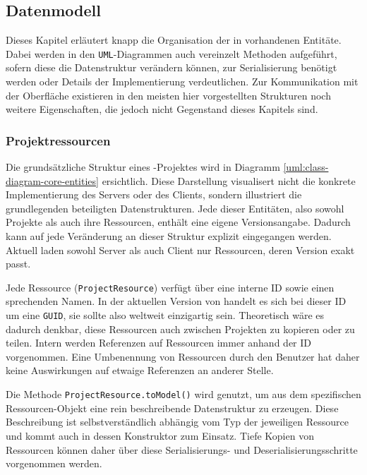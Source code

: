 \subsection{Datenmodell}

Dieses Kapitel erläutert knapp die Organisation der in \idename{} vorhandenen Entitäte. Dabei werden in den \texttt{UML}-Diagrammen auch vereinzelt Methoden aufgeführt, sofern diese die Datenstruktur verändern können, zur Serialisierung benötigt werden oder Details der Implementierung verdeutlichen. Zur Kommunikation mit der Oberfläche existieren in den meisten hier vorgestellten Strukturen noch weitere Eigenschaften, die jedoch nicht Gegenstand dieses Kapitels sind.

\subsubsection{Projektressourcen}

Die grundsätzliche Struktur eines \idename-Projektes wird in Diagramm \ref{uml:class-diagram-core-entities} ersichtlich. Diese Darstellung visualisert nicht die konkrete Implementierung des Servers oder des Clients, sondern illustriert die grundlegenden beteiligten Datenstrukturen. Jede dieser Entitäten, also sowohl Projekte als auch ihre Ressourcen, enthält eine eigene Versionsangabe. Dadurch kann auf jede Veränderung an dieser Struktur explizit eingegangen werden. Aktuell laden sowohl Server als auch Client nur Ressourcen, deren Version exakt passt.

Jede Ressource (\texttt{ProjectResource}) verfügt über eine interne ID sowie einen sprechenden Namen. In der aktuellen Version von \idename{} handelt es sich bei dieser ID um eine \texttt{GUID}, sie sollte also weltweit einzigartig sein. Theoretisch wäre es dadurch denkbar, diese Ressourcen auch zwischen Projekten zu kopieren oder zu teilen. Intern werden Referenzen auf Ressourcen immer anhand der ID vorgenommen. Eine Umbenennung von Ressourcen durch den Benutzer hat daher keine Auswirkungen auf etwaige Referenzen an anderer Stelle.

Die Methode \texttt{ProjectResource.toModel()} wird genutzt, um aus dem spezifischen Res\-sour\-cen-Objekt eine rein beschreibende Datenstruktur zu erzeugen. Diese Beschreibung ist selbstverständlich abhängig vom Typ der jeweiligen Ressource und kommt auch in dessen Konstruktor zum Einsatz. Tiefe Kopien von Ressourcen können daher über diese Se\-ria\-lisierungs- und Deserialisierungsschritte vorgenommen werden.

